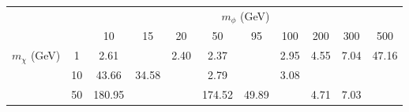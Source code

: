 \begin{tabular}{cc|ccccccccc} 
 & & \multicolumn{9}{c}{$m_\phi$ (GeV)} \\ 
& &10 & 15 & 20 & 50 & 95 & 100 & 200 & 300 & 500\\ 
 \hline \hline 
\multirow{3}{*}{$m_\chi$ (GeV)} & 1 & 2.61 &  & 2.40 & 2.37 &  & 2.95 & 4.55 & 7.04 & 47.16\\ 
 & 10 & 43.66 & 34.58 &  & 2.79 &  & 3.08 &  &  & \\ 
 & 50 & 180.95 &  &  & 174.52 & 49.89 &  & 4.71 & 7.03 & \\ 
 \end{tabular}
